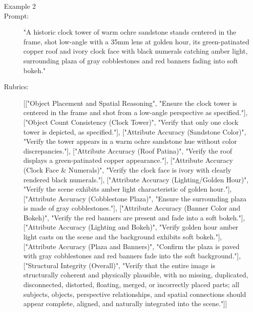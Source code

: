 \documentclass{llmxive}
\begin{document}
\begin{tcolorbox}
\begin{description}
\item[Example 2]
\item[Prompt:] "A historic clock tower of warm ochre sandstone stands centered in the frame, shot low-angle with a 35mm lens at golden hour, its green-patinated copper roof and ivory clock face with black numerals catching amber light, surrounding plaza of gray cobblestones and red banners fading into soft bokeh."
\item[Rubrics:] [["Object Placement and Spatial Reasoning", "Ensure the clock tower is centered in the frame and shot from a low-angle perspective as specified."], ["Object Count Consistency (Clock Tower)", "Verify that only one clock tower is depicted, as specified."], ["Attribute Accuracy (Sandstone Color)", "Verify the tower appears in a warm ochre sandstone hue without color discrepancies."], ["Attribute Accuracy (Roof Patina)", "Verify the roof displays a green-patinated copper appearance."], ["Attribute Accuracy (Clock Face \& Numerals)", "Verify the clock face is ivory with clearly rendered black numerals."], ["Attribute Accuracy (Lighting/Golden Hour)", "Verify the scene exhibits amber light characteristic of golden hour."], ["Attribute Accuracy (Cobblestone Plaza)", "Ensure the surrounding plaza is made of gray cobblestones."], ["Attribute Accuracy (Banner Color and Bokeh)", "Verify the red banners are present and fade into a soft bokeh."], ["Attribute Accuracy (Lighting and Bokeh)", "Verify golden hour amber light casts on the scene and the background exhibits soft bokeh."], ["Attribute Accuracy (Plaza and Banners)", "Confirm the plaza is paved with gray cobblestones and red banners fade into the soft background."], ["Structural Integrity (Overall)", "Verify that the entire image is structurally coherent and physically plausible, with no missing, duplicated, disconnected, distorted, floating, merged, or incorrectly placed parts; all subjects, objects, perspective relationships, and spatial connections should appear complete, aligned, and naturally integrated into the scene."]]



\end{description}
\end{tcolorbox}
\end{document}
